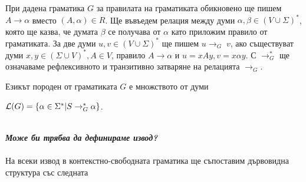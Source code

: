 \documentclass[11pt]{article} %
\begin{document}
При дадена граматика $G$ за правилата на граматиката обикновено ще пишем $A \to \alpha$ вместо $(A, \alpha) \in R$. Ще въвъедем релация между думи $\alpha, \beta \in (V \cup \Sigma)^{*}$, която ще казва, че думата $\beta$ се получава от $\alpha$ като приложим правило от граматиката. За две думи $u, v \in (V \cup \Sigma)^{*}$ ще пишем $u \to_{G}\;v$, ако съществуват думи $x, y \in (\Sigma \cup V)^{*}, A \in V$, правило $A \to \alpha$ и $u = xAy, v = x \alpha y$. С $\to^{*}_{G}$ ще означаваме рефлексивното и транзитивно затваряне на релацията $\to_{G}$.

Езикът породен от граматиката $G$ е множството от думи\\
\centerline{$\mathcal{L}(G)=\{\alpha \in \Sigma^{*} | S \to^{*}_{G}\alpha\}$.}\\

\textit{\textbf{Може би трябва да дефинираме извод?}}
\\\\
На всеки извод в контекстно-свободната граматика ще  съпоставим дървовидна структура със следната 
\end{document}

